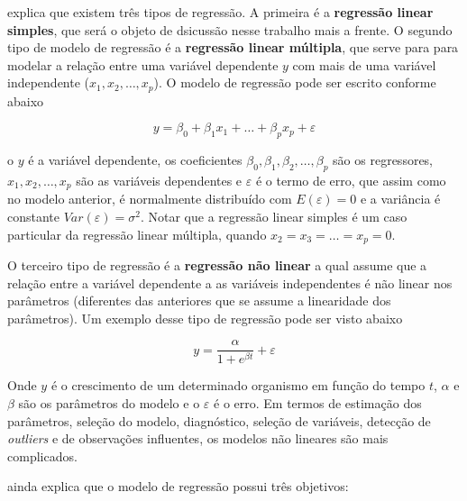  explica que existem três tipos de regressão. A primeira é a \textbf{regressão linear simples}, que será o objeto de dsicussão nesse trabalho mais a frente. O segundo tipo de modelo de regressão é a \textbf{regressão linear múltipla}, que serve para para modelar a relação entre uma variável dependente $y$ com mais de uma variável independente ($x_1, x_2, \dots, x_p$). O modelo de regressão pode ser escrito conforme abaixo

\begin{equation}
    y = \beta_0 + \beta_1 x_1 + \dots + \beta_p x_p + \varepsilon
\end{equation}

o $y$ é a variável dependente, os coeficientes $\beta_0, \beta_1, \beta_2, \dots, \beta_p$ são os regressores, $x_1, x_2, \dots, x_p$ são as variáveis dependentes e $\varepsilon$ é o termo de erro, que assim como no modelo anterior, é normalmente distribuído com $E(\varepsilon) = 0$ e a variância é constante $Var(\varepsilon) = \sigma^2$. Notar que a regressão linear simples é um caso particular da regressão linear múltipla, quando $x_2 = x_3 = \dots = x_p = 0$.

\noindent O terceiro tipo de regressão é a \textbf{regressão não linear} a qual assume que a relação entre a variável dependente a as variáveis independentes é não linear nos parâmetros (diferentes das anteriores que se assume a linearidade dos parâmetros). Um exemplo desse tipo de regressão pode ser visto abaixo

\begin{equation}
    y = \dfrac{\alpha}{1 + e^{\beta t}} + \varepsilon
\end{equation}

\noindent Onde $y$ é o crescimento de um determinado organismo em função do tempo $t$, $\alpha$ e $\beta$ são os parâmetros do modelo e o $\varepsilon$ é o erro. Em termos de estimação dos parâmetros, seleção do modelo, diagnóstico, seleção de variáveis, detecção de \textit{outliers} e de observações influentes, os modelos não lineares são mais complicados. 

\noindent {} ainda explica que o modelo de regressão possui três objetivos:

